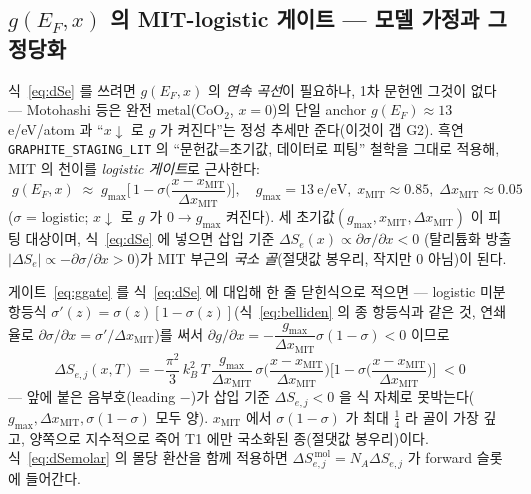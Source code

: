 \documentclass[11pt,a4paper]{article}
\newcommand{\code}[1]{\texttt{#1}}
\begin{document}
\subsection{$g(E_F,x)$ 의 MIT-logistic 게이트 — 모델 가정과 그 정당화}\label{sec:lco-gate}
식~\eqref{eq:dSe} 를 쓰려면 $g(E_F,x)$ 의 \emph{연속 곡선}이 필요하나, 1차 문헌엔 그것이 없다 — Motohashi 등\cite{motohashi2009}은
완전 metal($\mathrm{CoO_2}$, $x{=}0$)의 단일 anchor $g(E_F)\!\approx\!13$ e/eV/atom 과 ``$x\!\downarrow$ 로 $g$ 가
켜진다''는 정성 추세만 준다(이것이 갭 G2). 흑연 \code{GRAPHITE\_STAGING\_LIT} 의 ``문헌값=초기값, 데이터로 피팅''
철학을 그대로 적용해, MIT 의 천이를 \emph{logistic 게이트}로 근사한다:
\begin{equation}
\boxed{\;g(E_F,x)\;\approx\;g_{\max}\Big[\,1-\sigma\!\Big(\frac{x-x_\mathrm{MIT}}{\Delta x_\mathrm{MIT}}\Big)\Big],
\quad g_{\max}=13\ \text{e/eV},\;x_\mathrm{MIT}\approx0.85,\;\Delta x_\mathrm{MIT}\approx0.05\;}
\label{eq:ggate}
\end{equation}
($\sigma$ = logistic; $x\!\downarrow$ 로 $g$ 가 $0\!\to\!g_{\max}$ 켜진다). 세 초기값$(g_{\max},x_\mathrm{MIT},
\Delta x_\mathrm{MIT})$ 이 피팅 대상이며, 식~\eqref{eq:dSe} 에 넣으면 삽입 기준 $\Delta S_e(x)\propto\partial\sigma/\partial x<0$
(탈리튬화 방출 $|\Delta S_e|\propto-\partial\sigma/\partial x>0$)가 MIT 부근의 \emph{국소 골}(절댓값 봉우리, 작지만 0 아님)이 된다.

게이트~\eqref{eq:ggate} 를 식~\eqref{eq:dSe} 에 대입해 한 줄 닫힌식으로 적으면 — logistic 미분 항등식
$\sigma'(z)=\sigma(z)[1-\sigma(z)]$(식~\eqref{eq:belliden} 의 종 항등식과 같은 것, 연쇄율로
$\partial\sigma/\partial x=\sigma'/\Delta x_\mathrm{MIT}$)를 써서 $\partial g/\partial x=-\dfrac{g_{\max}}{\Delta x_\mathrm{MIT}}
\sigma(1-\sigma)<0$ 이므로
\begin{equation}
\boxed{\;\Delta S_{e,j}(x,T)
=-\frac{\pi^2}{3}\,k_B^2\,T\,\frac{g_{\max}}{\Delta x_\mathrm{MIT}}\,
\sigma\!\Big(\frac{x-x_\mathrm{MIT}}{\Delta x_\mathrm{MIT}}\Big)
\Big[1-\sigma\!\Big(\frac{x-x_\mathrm{MIT}}{\Delta x_\mathrm{MIT}}\Big)\Big]\;<0\;}
\label{eq:dSegate}
\end{equation}
— 앞에 붙은 음부호(leading $-$)가 삽입 기준 $\Delta S_{e,j}<0$ 을 식 자체로 못박는다($g_{\max},\Delta x_\mathrm{MIT},
\sigma(1-\sigma)$ 모두 양). $x_\mathrm{MIT}$ 에서 $\sigma(1-\sigma)$ 가 최대 $\tfrac14$ 라 골이 가장 깊고, 양쪽으로
지수적으로 죽어 T1 에만 국소화된 종(절댓값 봉우리)이다. 식~\eqref{eq:dSemolar} 의 몰당 환산을 함께 적용하면
$\Delta S_{e,j}^{\,\mathrm{mol}}=N_A\Delta S_{e,j}$ 가 forward 슬롯에 들어간다.
\end{document}
